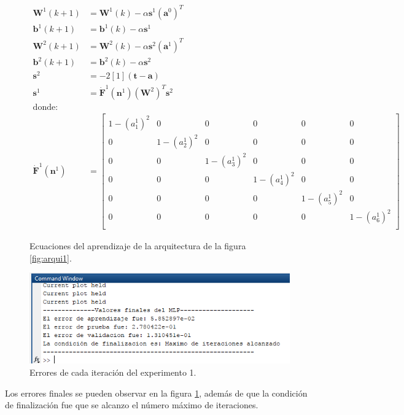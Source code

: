 \begin{figure}[H]
    \begin{align*}
    \boldsymbol{W}^{1}(k+1) &= \boldsymbol{W}^{1}(k) - \alpha \boldsymbol{s}^{1} (\boldsymbol{a}^{0})^T \\
    \boldsymbol{b}^{1}(k+1) &= \boldsymbol{b}^{1}(k) - \alpha \boldsymbol{s}^{1} \\
    \boldsymbol{W}^{2}(k+1) &= \boldsymbol{W}^{2}(k) - \alpha \boldsymbol{s}^{2} (\boldsymbol{a}^{1})^T \\
    \boldsymbol{b}^{2}(k+1) &= \boldsymbol{b}^{2}(k) - \alpha \boldsymbol{s}^{2} \\
    \boldsymbol{s}^2 &= 
    -2 \left[ 1 \right] (\boldsymbol{t-a}) \\
    \boldsymbol{s}^{1} &= 
    \boldsymbol{\dot{F}}^{1}(\boldsymbol{n}^{1})(\boldsymbol{W}^{2})^{T}
    \boldsymbol{s}^{2} \\
    \text{donde:} \\
    \boldsymbol{\dot{F}}^{1}(\boldsymbol{n}^{1}) &=
    \begin{bmatrix}
        1-(a_{1}^1)^2 & 0 & 0 & 0 & 0 & 0 \\
        0 & 1-(a_{2}^1)^2 & 0 & 0 & 0 & 0 \\
        0 & 0 & 1-(a_{3}^1)^2 & 0 & 0 & 0 \\
        0 & 0 & 0 & 1-(a_{4}^1)^2 & 0 & 0 \\
        0 & 0 & 0 & 0 & 1-(a_{5}^1)^2 & 0 \\
        0 & 0 & 0 & 0 & 0 & 1-(a_{6}^1)^2 \\
    \end{bmatrix}
    \end{align*}
    \caption{Ecuaciones del aprendizaje de la arquitectura de la figura \ref{fig:arqui1}.}
\end{figure}

\begin{figure}[H]
    \begin{center}
        \includegraphics[width=14cm]{1/salida.png}
        \caption{Errores de cada iteración del experimento 1.}
        \label{fig:salida1}
    \end{center}
\end{figure}
Los errores finales se pueden observar en la figura \ref{fig:salida1}, además de que la condición de finalización fue que se alcanzo el número máximo de iteraciones.

